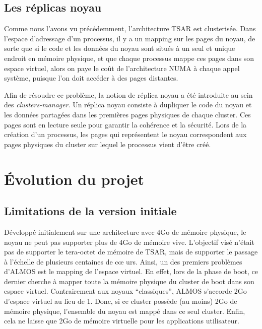       
    \subsection{Les réplicas noyau}

      Comme nous l'avons vu précédemment, l'architecture TSAR est clusterisée.
      Dans l'espace d'adressage d'un processus, il y a un mapping sur les pages
      du noyau, de sorte que si le code et les données du noyau sont situés à un
      seul et unique endroit en mémoire physique, et que chaque processus mappe
      ces pages dans son espace virtuel, alors on paye le coût de l'architecture
      NUMA à chaque appel système, puisque l'on doit accéder à des pages
      distantes.

      Afin de résoudre ce problème, la notion de réplica noyau a été introduite
      au sein des \textit{clusters-manager}. Un réplica noyau consiste à
      dupliquer le code du noyau et les données partagées dans les premières
      pages physiques de chaque cluster. Ces pages sont en lecture seule pour
      garantir la cohérence et la sécurité. Lors de la création d'un processus,
      les pages qui représentent le noyau correspondent aux pages physiques du
      cluster sur lequel le processus vient d'être créé.


  \section{Évolution du projet}

    \subsection{Limitations de la version initiale}
    
      Développé initialement sur une architecture avec 4Go de mémoire physique,
      le noyau ne peut pas supporter plus de 4Go de mémoire vive. L'objectif
      visé n'était pas de supporter le tera-octet de mémoire de TSAR, mais de
      supporter le passage à l'échelle de plusieurs centaines de c\oe
      urs. Ainsi, un des premiers problèmes d'ALMOS est le mapping de l'espace
      virtuel. En effet, lors de la phase de boot, ce dernier cherche à mapper
      toute la mémoire physique du cluster de boot dans son espace
      virtuel. Contrairement aux noyaux ``classiques'', ALMOS s'accorde 2Go
      d'espace virtuel au lieu de 1. Donc, si ce cluster possède (au moins) 2Go
      de mémoire physique, l'ensemble du noyau est mappé dans ce seul
      cluster. Enfin, cela ne laisse que 2Go de mémoire virtuelle pour les
      applications utilisateur.

